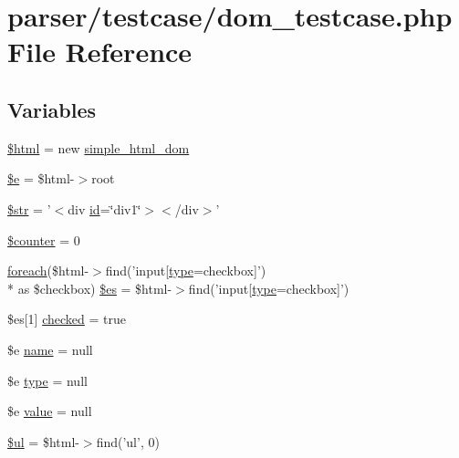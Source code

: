 \hypertarget{dom__testcase_8php}{\section{parser/testcase/dom\+\_\+testcase.php File Reference}
\label{dom__testcase_8php}
}
\subsection*{Variables}
\begin{DoxyCompactItemize}
\item 
\hyperlink{dom__testcase_8php_a6f96e7fc92441776c9d1cd3386663b40}{\$html} = new \hyperlink{classsimple__html__dom}{simple\+\_\+html\+\_\+dom}
\item 
\hyperlink{dom__testcase_8php_ab74076a9b7e1d23d12b9e8d65e60315a}{\$e} = \$html-\/$>$root
\item 
\hyperlink{dom__testcase_8php_a7542d95618011800c61773127fa625cf}{\$str} = '$<$div \hyperlink{invalid__testcase_8php_af94d69fa7897fa25e80204500b8586eb}{id}=\char`\"{}div1\char`\"{}$>$$<$/div$>$'
\item 
\hyperlink{dom__testcase_8php_af6e35bb61d58e268ba65118e7131d906}{\$counter} = 0
\item 
\hyperlink{submit_8php_ac504d4a137641e880f0b9693d36d2e16}{foreach}(\$html-\/$>$find('input\mbox{[}\hyperlink{dom__testcase_8php_a2dac418d51f3729b0a56d68ba81f17b1}{type}=checkbox\mbox{]}') \\*
as \$checkbox) \hyperlink{dom__testcase_8php_a388cbda27103d2baee3997798d1f2744}{\$es} = \$html-\/$>$find('input\mbox{[}\hyperlink{dom__testcase_8php_a2dac418d51f3729b0a56d68ba81f17b1}{type}=checkbox\mbox{]}')
\item 
\$es\mbox{[}1\mbox{]} \hyperlink{dom__testcase_8php_a4f94e2717068dd53cc425872ce111b17}{checked} = true
\item 
\$e \hyperlink{dom__testcase_8php_a7e76f3957f225b9a14d6fab0a55392ce}{name} = null
\item 
\$e \hyperlink{dom__testcase_8php_a2dac418d51f3729b0a56d68ba81f17b1}{type} = null
\item 
\$e \hyperlink{dom__testcase_8php_aa1e367627f46ba8a185ec02e58272f80}{value} = null
\item 
\hyperlink{dom__testcase_8php_a366d002f1f686d0884af91b64e877eb9}{\$ul} = \$html-\/$>$find('ul', 0)
\end{DoxyCompactItemize}


